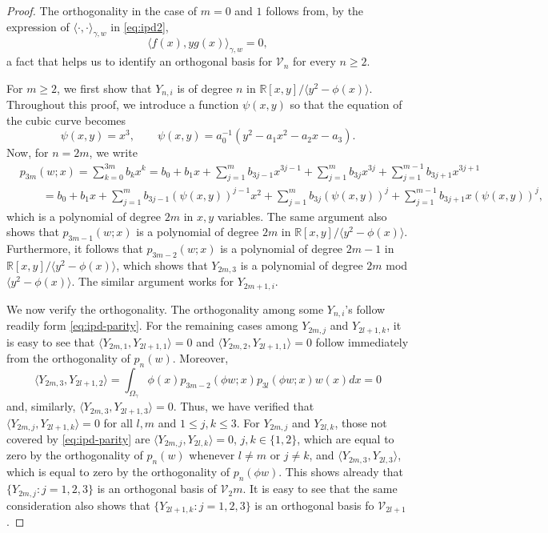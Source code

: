 \documentclass{amsart}
\theoremstyle{remark}
\def\la{{\langle}}
\def\ra{{\rangle}}
\def\g{{\gamma}}
\def\la{{\langle}}
\def\ra{{\rangle}}
\def\CV{{\mathcal V}}
\def\RR{{\mathbb R}}
\begin{document}
\begin{proof}
The orthogonality in the case of $m=0$ and $1$ follows from, by the expression of $\la \cdot,\cdot\ra_{\g,w}$
in \eqref{eq:ipd2}, 
\begin{equation} \label{eq:ipd-parity}
  \la f(x), y g(x) \ra_{\g,w} = 0, 
\end{equation}
a fact that helps us to identify an orthogonal basis for $\CV_n$ for every $n \ge 2$. 

For $m \ge 2$, we first show that $Y_{n,i}$ is of degree $n$ in $\RR[x,y] / \la y^2 - \phi(x)\ra$. Throughout 
this proof, we introduce a function $\psi(x,y)$ so that the equation of the cubic curve becomes
$$
     \psi (x,y) = x^3, \qquad \psi(x,y) = a_0^{-1}( y^2 - a_1 x^2-a_2 x - a_3).
$$
Now, for $n =2m$, we write
\begin{align*}
& p_{3m}(w;x) = \sum_{k=0}^{3m} b_k x^k  = b_0 + b_1 x + \sum_{j=1}^{m} b_{3j-1} x^{3j-1} +
  \sum_{j=1}^{m} b_{3j} x^{3j} +  \sum_{j=1}^{m-1} b_{3j+1} x^{3j+1} \\
  &\qquad = b_0 + b_1 x + \sum_{j=1}^{m} b_{3j-1} (\psi(x,y))^{j-1}x^2 +
  \sum_{j=1}^{m} b_{3j} (\psi(x,y))^j + \sum_{j=1}^{m-1} b_{3j+1} x (\psi(x,y))^j, 
\end{align*}
which is a polynomial of degree $2m$ in $x,y$ variables. The same argument also shows that $p_{3m-1}(w;x)$
is a polynomial of degree $2m$ in $\RR[x,y] / \la y^2 - \phi(x)\ra$. Furthermore, it follows that $p_{3m-2}(w;x)$
is a polynomial of degree $2m-1$ in $\RR[x,y] / \la y^2 - \phi(x)\ra$, which shows that $Y_{2m,3}$ is a 
polynomial of degree $2m$ mod $ \la y^2 - \phi(x)\ra$. The similar argument works for $Y_{2m+1,i}$. 

We now verify the orthogonality. The orthogonality among some $Y_{n,i}$'s follow readily form \eqref{eq:ipd-parity}.
For the remaining cases among $Y_{2m,j}$ and $Y_{2 l +1,k}$, it is easy to see that $\la Y_{2m,1}, Y_{2l+1,1} \ra = 0$
and $\la Y_{2m,2}, Y_{2l+1,1} \ra =0$ follow immediately from the orthogonality of $p_n(w)$. Moreover, 
$$
   \la Y_{2m,3}, Y_{2l+1,2} \ra = \int_{\Omega_\g}  \phi(x) p_{3m-2}(\phi w;x) p_{3l}(\phi w;x) w(x) d x = 0
$$ 
and, similarly,  $\la Y_{2m,3}, Y_{2l+1,3} \ra =0$. Thus, we have verified that $\la Y_{2m,j}, Y_{2l+1,k}\ra = 0$
for all $l, m$ and $1\le j,k \le 3$. For $Y_{2m,j}$ and $Y_{2l,k}$, those not covered by  \eqref{eq:ipd-parity} are
$\la Y_{2m,j}, Y_{2l,k} \ra = 0$, $j, k \in \{1,2\}$, which are equal to zero by the orthogonality of $p_n(w)$ whenever
$l \ne m$ or $j \ne k$, and $\la Y_{2m,3}, Y_{2l,3} \ra$, which is equal to zero by the orthogonality of $p_n(\phi w)$. 
This shows already that $\{Y_{2m,j}: j=1,2,3\}$ is an orthogonal basis of $\CV_2m$. It is easy to see that the same consideration also shows that $\{Y_{2l+1,k}:j=1,2,3\}$ is an orthogonal basis fo $\CV_{2l+1}$. 


\end{proof}
\end{document}
